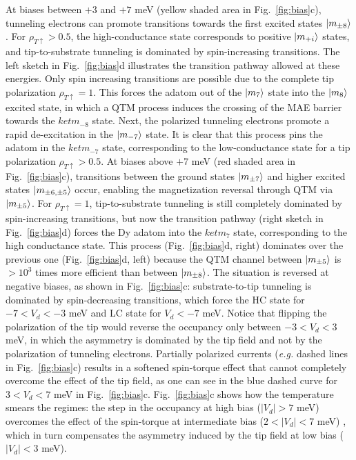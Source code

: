 \documentclass[
reprint,amsmath,amssymb,aps]{revtex4-2}
\begin{document}
At biases between $+3$ and $+7$ meV (yellow shaded area in Fig.~\ref{fig:bias}c), tunneling electrons can promote transitions towards the first excited states $\ket{m_{\pm 8}}$. For $\rho_{T \uparrow} > 0.5 $, the high-conductance state corresponds to positive $\ket{m_{+i}}$ states, and tip-to-substrate tunneling is dominated by spin-increasing transitions. The left sketch in Fig.~\ref{fig:bias}d illustrates the transition pathway allowed at these energies. Only spin increasing transitions are possible due to the complete tip polarization $\rho_{T \uparrow} = 1$. This forces the adatom out of the $\ket{m_{7}}$ state into the $\ket{m_{8}}$ excited state, in which a QTM process induces the crossing of the MAE barrier towards the $ket{m_{-8}}$ state. Next, the polarized tunneling electrons promote a rapid de-excitation in the $\ket{m_{-7}}$ state. It is clear that this process pins the adatom in the $ket{m_{-7}}$ state, corresponding to the low-conductance state for a tip polarization $\rho_{T \uparrow} > 0.5 $. At biases above $+7$ meV (red shaded area in Fig.~\ref{fig:bias}c), transitions between the ground states $\ket{m_{\pm7}}$ and higher excited states $\ket{m_{\pm 6, \pm 5}}$ occur, enabling the magnetization reversal through QTM via $\ket{m_{\pm 5}}$. For $\rho_{T \uparrow} = 1 $, tip-to-substrate tunneling is still completely dominated by spin-increasing transitions, but now the transition pathway (right sketch in Fig.~\ref{fig:bias}d) forces the Dy adatom into the $ket{m_{7}}$ state, corresponding to the high conductance state. This process (Fig.~\ref{fig:bias}d, right) dominates over the previous one (Fig.~\ref{fig:bias}d, left) because the QTM channel between $\ket{m_{\pm 5}}$ is $>10^3$ times more efficient than between $\ket{m_{\pm 8}}$. The situation is reversed at negative biases, as shown in Fig.~\ref{fig:bias}c: substrate-to-tip tunneling is dominated by spin-decreasing transitions, which force the HC state for $-7<V_d<-3$ meV and LC state for $V_d<-7$ meV. Notice that flipping the polarization of the tip would reverse the occupancy only between $-3<V_d<3$ meV, in which the asymmetry is dominated by the tip field and not by the polarization of tunneling electrons. Partially polarized currents (\textit{e.g.} dashed lines in Fig.~\ref{fig:bias}c) results in a softened spin-torque effect that cannot completely overcome the effect of the tip field, as one can see in the blue dashed curve for $3<V_d<7$ meV in Fig.~\ref{fig:bias}c.  Fig.~\ref{fig:bias}c shows how the temperature smears the regimes: the step in the occupancy at high bias ($|V_d|>7$ meV) overcomes the effect of the spin-torque at intermediate bias ($2<|V_d|<7$ meV) , which in turn compensates the asymmetry induced by the tip field at low bias ($|V_d|<3$ meV).
\end{document}
